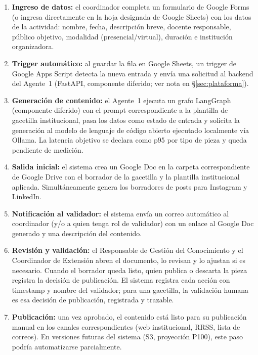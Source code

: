 \documentclass[a4paper, 12pt]{article}
\begin{document}
\begin{enumerate}[label=\textbf{Paso \arabic*:}]
  \item \textbf{Ingreso de datos:} el coordinador completa un formulario de Google Forms (o ingresa directamente en la hoja designada de Google Sheets) con los datos de la actividad: nombre, fecha, descripci\'on breve, docente responsable, p\'ublico objetivo, modalidad (presencial/virtual), duraci\'on e instituci\'on organizadora.

  \item \textbf{Trigger autom\'atico:} al guardar la fila en Google Sheets, un trigger de Google Apps Script detecta la nueva entrada y env\'ia una solicitud al backend del Agente~1 (FastAPI, componente diferido; ver nota en \S\ref{sec:plataforma}).

  \item \textbf{Generaci\'on de contenido:} el Agente~1 ejecuta un grafo LangGraph (componente diferido) con el prompt correspondiente a la plantilla de gacetilla institucional, pasa los datos como estado de entrada y solicita la generaci\'on al modelo de lenguaje de c\'odigo abierto ejecutado localmente v\'ia Ollama. La latencia objetivo se declara como p95 por tipo de pieza y queda pendiente de medici\'on.

  \item \textbf{Salida inicial:} el sistema crea un Google Doc en la carpeta correspondiente de Google Drive con el borrador de la gacetilla y la plantilla institucional aplicada. Simult\'aneamente genera los borradores de posts para Instagram y LinkedIn.

  \item \textbf{Notificaci\'on al validador:} el sistema env\'ia un correo autom\'atico al coordinador (y/o a quien tenga rol de validador) con un enlace al Google Doc generado y una descripci\'on del contenido.

  \item \textbf{Revisi\'on y validaci\'on:} el Responsable de Gesti\'on del Conocimiento y el Coordinador de Extensi\'on abren el documento, lo revisan y lo ajustan si es necesario. Cuando el borrador queda listo, quien publica o descarta la pieza registra la decisi\'on de publicaci\'on. El sistema registra cada acci\'on con timestamp y nombre del validador; para una gacetilla, la validaci\'on humana es esa decisi\'on de publicaci\'on, registrada y trazable.

  \item \textbf{Publicaci\'on:} una vez aprobado, el contenido est\'a listo para su publicaci\'on manual en los canales correspondientes (web institucional, \ac{RRSS}, lista de correos). En versiones futuras del sistema (S3, proyecci\'on P100), este paso podr\'ia automatizarse parcialmente.
\end{enumerate}
\end{document}

